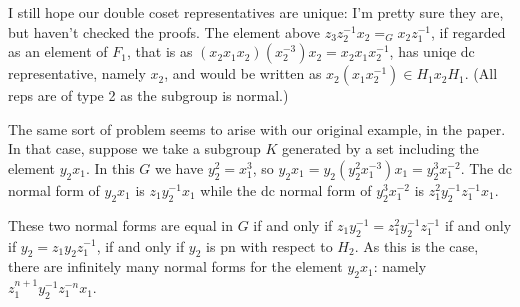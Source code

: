\documentclass[a4paper,12pt]{article}
\numberwithin{equation}{section}
\numberwithin{figure}{section}
\begin{document}
I still hope our double coset representatives are unique: I'm pretty sure
they are, but haven't checked the proofs. The element above 
$z_3z_2^{-1}x_2=_G x_2z_1^{-1}$, if regarded as an element of $F_1$, that is
as $(x_2x_1x_2)(x_2^{-3})x_2=x_2x_1x_2^{-1}$, has uniqe dc representative, namely $x_2$, and 
would be written as $x_2(x_1x_2^{-1})\in H_1x_2H_1$.
(All reps are of type 2 as the subgroup is normal.)

The same sort of problem seems to arise with our original example, in the paper.
In that case, suppose we take a subgroup $K$ generated by a set including the 
element $y_2x_1$. In this $G$ we have
$y_2^2=x_1^3$, so $y_2x_1=y_2(y_2^2x_1^{-3})x_1=y_2^3x_1^{-2}$. The dc normal 
form of $y_2x_1$ is $z_1y_2^{-1}x_1$ while the dc normal form of $y_2^3x_1^{-2}$
 is $z_1^2y_2^{-1}z_1^{-1}x_1$.

These two normal forms are equal in $G$ if and only if $z_1y_2^{-1}= z_1^2y_2^{-1}z_1^{-1}$
if and only if $y_2=z_1y_2z_1^{-1}$, if and only if $y_2$ is pn with respect to $H_2$. As this is the case, there are infinitely many normal forms
for the element $y_2x_1$: namely $z_1^{n+1}y_2^{-1}z_1^{-n}x_1$. 
\end{document}
